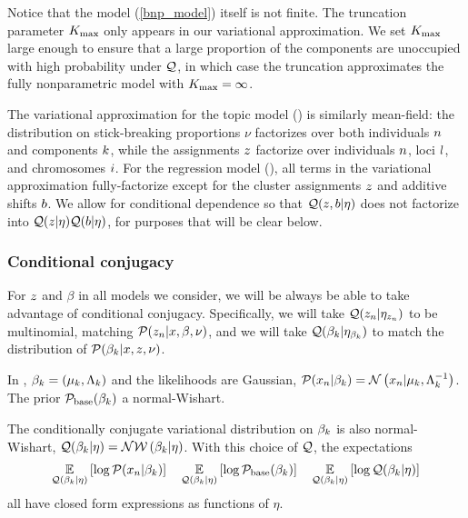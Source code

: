 Notice that the model (\eqref{bnp_model}) itself is not finite. The truncation
parameter ${K_{\mathrm{max}}}$ only appears in our variational approximation.
We set ${K_{\mathrm{max}}}$ large enough to ensure that a large
proportion of the components are unoccupied with high probability under $\mathcal{Q}$,
in which case the truncation approximates the fully nonparametric model with ${K_{\mathrm{max}}} = \infty$.

The variational approximation for the topic model ()
is similarly mean-field: the distribution on stick-breaking proportions $\nu$
factorizes over
both individuals $n$ and components $k$, while the
assignments $z$
factorize over individuals $n$, loci $l$, and chromosomes $i$.
For the regression model (), all terms in the
variational approximation fully-factorize
except for the cluster assignments $z$ and additive shifts $b$.
We allow for conditional dependence so that
$\mathcal{Q}(z, b \vert \eta)$ does not factorize into
$\mathcal{Q}(z \vert \eta)\mathcal{Q}(b \vert \eta)$,
for purposes that will be clear below.

\subsubsection{Conditional conjugacy}

For $z$ and $\beta$ in all models we consider, we will be always be able to
take advantage of conditional conjugacy. Specifically, we will take $\mathcal{Q}(z_{n}
\vert \eta_{z_n})$ to be multinomial, matching $\mathcal{P}(z_{n}
\vert x, \beta, \nu)$, and we will take $\mathcal{Q}(\beta_k \vert \eta_{\beta_k})$
to match the distribution of $\mathcal{P}(\beta_{k} \vert x, z, \nu)$.



\begin{ex}
%
In , $\beta_k = (\mu_k, \Lambda_k)$ and the likelihoods are Gaussian,
$\mathcal{P}(x_n \vert \beta_k) = \mathcal{N}\left(x_n \vert \mu_k, \Lambda_k^{-1}\right)$.
The prior $\mathcal{P}_{\mathrm{base}}(\beta_k)$ a normal-Wishart.

The conditionally conjugate variational distribution on $\beta_k$ is
also normal-Wishart, $\mathcal{Q}(\beta_k \vert \eta) = \mathcal{N}\mathcal{W}\left(\beta_k \vert \eta\right)$.
With this choice of $\mathcal{Q}$, the expectations
\begin{align*}
\underset{\mathcal{Q}(\beta_k \vert \eta)}{\mathbb{E}}\left[\log \mathcal{P}(x_n \vert \beta_k)\right] \quad
\underset{\mathcal{Q}(\beta_k \vert \eta)}{\mathbb{E}}\left[\log \mathcal{P}_{\mathrm{base}}(\beta_k)\right] \quad
\underset{\mathcal{Q}(\beta_k \vert \eta)}{\mathbb{E}}\left[\log \mathcal{Q}(\beta_k \vert \eta)\right]
\end{align*}
all have closed form expressions as functions of $\eta$.
%
\end{ex}

